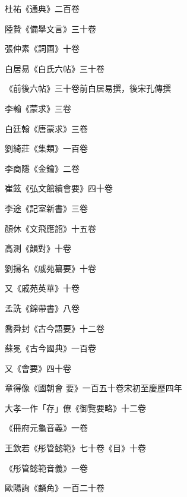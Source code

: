 \begin{pinyinscope}
 杜祐《通典》二百卷



 陸贄《備舉文言》三十卷



 張仲素《詞圃》十卷



 白居易《白氏六帖》三十卷



 《前後六帖》三十卷前白居易撰，後宋孔傳撰



 李翰《蒙求》三卷



 白廷翰《唐蒙求》三卷



 劉綺莊《集類》一百卷



 李商隱《金鑰》二卷



 崔鉉《弘文館續會要》四十卷



 李途《記室新書》三卷



 顏休《文飛應韶》十五卷



 高測《韻對》十卷



 劉揚名《戚苑纂要》十卷



 又《戚苑英華》十卷



 孟詵《錦帶書》八卷



 喬舜封《古今語要》十二卷



 蘇冕《古今國典》一百卷



 又《會要》四十卷



 章得像《國朝會
 要》一百五十卷宋初至慶歷四年



 大孝一作「存」僚《御覽要略》十二卷



 《冊府元龜音義》一卷



 王欽若《彤管懿範》七十卷《目》十卷



 《彤管懿範音義》一卷



 歐陽詢《麟角》一百二十卷




\end{pinyinscope}
